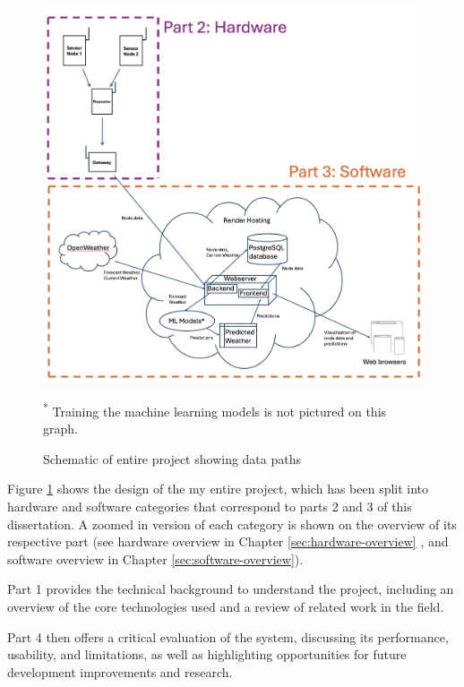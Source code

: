 \begin{figure}[H]
    \centering
    \includegraphics[width=1\textwidth]{contents/part-1/fig1/project-schema.png}
    \par\vspace{1pt} \noindent\begin{minipage}{0.95\textwidth}
    \centering\footnotesize\textsuperscript{*} Training the machine learning
    models is not pictured on this graph.
    \end{minipage}
    \par\vspace{1pt}
    \caption{Schematic of entire project showing data paths}
    \label{fig:project-schema}
\end{figure}

Figure \ref{fig:project-schema} shows the design of the my entire project, which
has been split into hardware and software categories that correspond to parts 2
and 3 of this dissertation.  A zoomed in version of each category is shown on
the overview of its respective part (see hardware overview in Chapter
\ref{sec:hardware-overview} , and software overview in Chapter
\ref{sec:software-overview}).

Part 1 provides the technical background to understand the project, including an
overview of the core technologies used and a review of related work in the
field. 

Part 4 then offers a critical evaluation of the system, discussing its
performance, usability, and limitations, as well as highlighting opportunities
for future development improvements and research. 